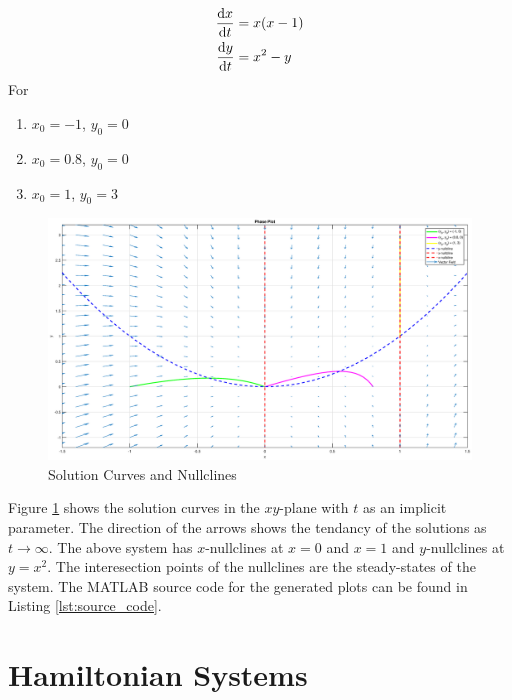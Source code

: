 \documentclass[12pt,1in]{article}
\newenvironment{Example}[2][Example]{\begin{trivlist}
		\item[\hskip \labelsep {\bfseries #1}\hskip \labelsep {\bfseries #2.}]}{\end{trivlist}}
\begin{document}
\begin{Example}{3}
	\cite[p.~487]{diff_eq}
	\begin{align*}
	\derivative{x}{t} &= x(x - 1)\\
	\derivative{y}{t} &= x^2 - y
	\end{align*}
	For 
	\begin{enumerate}
		\item $x_0 = -1$, $y_0 = 0$
		\item $x_0 = 0.8$, $y_0 = 0$
		\item $x_0 = 1$, $y_0 = 3$
	\end{enumerate}
\begin{figure}[H]
	\centering
	\includegraphics[trim={2in 0 2in 0},width=1\linewidth]{Figures/example_3_phase}
	\caption{Solution Curves and Nullclines}
	\label{fig:example3}
\end{figure}
Figure \ref{fig:example3} shows the solution curves in the $xy$-plane with $t$ as an implicit parameter. The direction of the arrows shows the tendancy of the solutions as $t\rightarrow\infty$. The above system has $x$-nullclines at $x = 0$ and $x = 1$ and $y$-nullclines at $y = x^2$. The interesection points of the nullclines are the steady-states of the system. The MATLAB source code for the generated plots can be found in Listing \ref{lst:source_code}.
 
\end{Example}
\section{Hamiltonian Systems}
\end{document}
